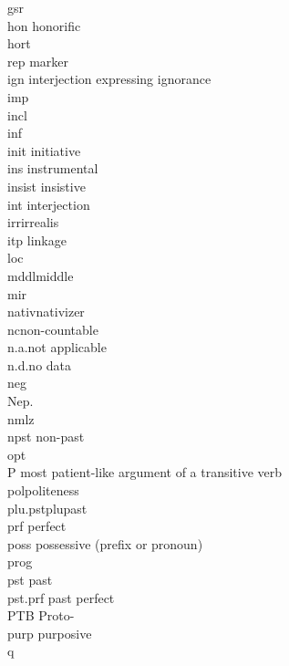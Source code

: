 \begin{refsection}
{\begin{tabbing}
{\sc gsr} \> \\
{\sc hon}\> honorific\\
{\sc hort} \> \\
{\sc rep}\>  marker\\
{\sc ign}\>  interjection expressing ignorance\\
{\sc imp} \> \\
{\sc incl}\> \\
{\sc inf} \> \\
{\sc init} \> initiative\\
{\sc ins} \> instrumental\\
{\sc insist} \> insistive\\
{\sc int} \> interjection\\
{\sc irr}\>irrealis\\
{\sc itp} \>  linkage\\
{\sc loc} 	 \>  \\
{\sc mddl}\>middle\\
{\sc mir} \> \\
{\sc nativ}\>nativizer\\
{\sc nc}\>non-countable\\
n.a.\>not applicable\\
n.d.\>no data\\
{\sc neg} \>	\\
Nep. \>	\\
{\sc nmlz} \>	\\
{\sc npst} \> non-past\\
{\sc opt} \> \\
P 	\> most patient-like argument of a transitive verb\\
{\sc pol}\>politeness\\
{\sc plu.pst}\>plupast\\
{\sc prf}\> perfect \\
{\sc poss} \> possessive (prefix or pronoun)\\
{\sc prog} \> \\
{\sc pst} \> past \\
{\sc pst.prf} \> past perfect\\
PTB \> Proto-\\
{\sc purp}\> purposive\\
{\sc q} \> \\

\end{tabbing}}
\end{refsection}
